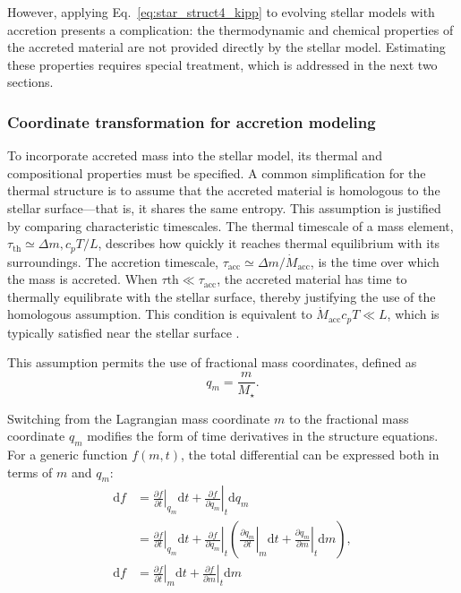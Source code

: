 \documentclass[12pt,a4paper]{article}
\newcommand{\mr}{\mathrm}
\newcommand{\pfird}[2][]{\frac{\partial#1}{\partial#2}}
\newcommand{\dd}[1]{\mathrm{d}#1}
\begin{document}
However, applying Eq.~\eqref{eq:star_struct4_kipp} to evolving stellar models with accretion presents a complication: the thermodynamic and chemical properties of the accreted material are not provided directly by the stellar model. Estimating these properties requires special treatment, which is addressed in the next two sections.

\subsubsection{Coordinate transformation for accretion modeling}
\label{sec:accretion_coords}

To incorporate accreted mass into the stellar model, its thermal and compositional properties must be specified. A common simplification for the thermal structure is to assume that the accreted material is homologous to the stellar surface—that is, it shares the same entropy. This assumption is justified by comparing characteristic timescales. The thermal timescale of a mass element, $\tau_\mr{th} \simeq \Delta m, c_p T / L$, describes how quickly it reaches thermal equilibrium with its surroundings. The accretion timescale, $\tau_\mr{acc} \simeq \Delta m / \dot{M}_\mr{acc}$, is the time over which the mass is accreted. When $\tau\mr{th} \ll \tau_\mr{acc}$, the accreted material has time to thermally equilibrate with the stellar surface, thereby justifying the use of the homologous assumption. This condition is equivalent to $\dot{M}_\mr{acc} c_p T \ll L$, which is typically satisfied near the stellar surface \parencite{SugimotoNomoto1975,PaxtonEtAl2015}. 

This assumption permits the use of fractional mass coordinates, defined as \parencite{SugimotoNomoto1975}
\begin{equation}
  q_m = \frac{m}{M_\star}. \label{eq:frac_mass_coord}
\end{equation}

Switching from the Lagrangian mass coordinate $m$ to the fractional mass coordinate $q_m$ modifies the form of time derivatives in the structure equations. For a generic function $f(m,t)$, the total differential can be expressed both in terms of $m$ and $q_m$:
\begin{align}
  \dd{f} &= \left.\pfird[f]{t}\right|_{q_m} \dd{t} + \left.\pfird[f]{q_m}\right|_t\dd{q_m}\\ 
  &= \left.\pfird[f]{t}\right|_{q_m} \dd{t} + \left.\pfird[f]{q_m}\right|_t\left(\left.\pfird[q_m]{t}\right|_m \dd{t} + \left.\pfird[q_m]{m}\right|_t \dd{m}\right),\nonumber\\
  \dd{f} &= \left.\pfird[f]{t}\right|_m \dd{t} + \left.\pfird[f]{m}\right|_t \dd{m}
\end{align}
\end{document}
